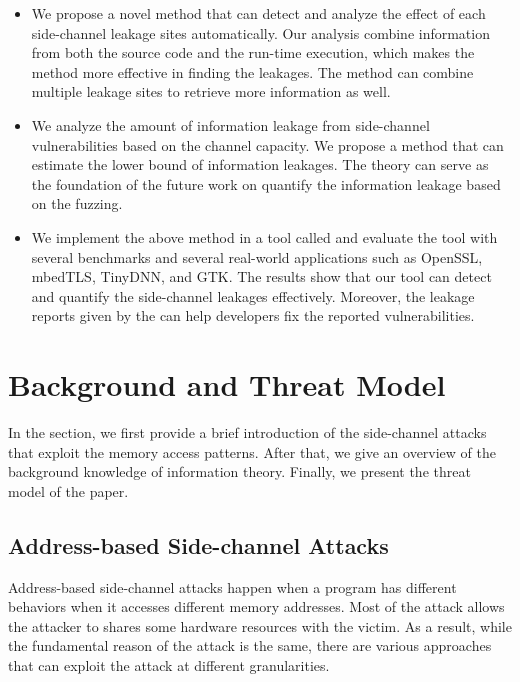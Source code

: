 \begin{itemize}

\item We propose a novel method that can detect and analyze the effect of each side-channel leakage sites automatically. Our analysis combine information from both the source code and the run-time execution, which makes the method more effective in finding the leakages. The method can combine multiple leakage sites to retrieve more information as well.

\item We analyze the amount of information leakage from side-channel vulnerabilities based on the channel capacity. We propose a method that can estimate the lower bound of information leakages. The theory can serve as the foundation of the future work on quantify the information leakage based on the fuzzing.

\item We implement the above method in a tool called \tool{} and evaluate the tool with several benchmarks and several real-world applications such as OpenSSL, mbedTLS, TinyDNN, and GTK. The results show that our tool can detect and quantify the side-channel leakages effectively. Moreover, the leakage reports given by the \tool{} can help developers fix the reported vulnerabilities.
\end{itemize}

\section{Background and Threat Model}
In the section, we first provide a brief introduction of the side-channel attacks that exploit the memory access patterns. After that, we give an overview of the background knowledge of information theory. Finally, we present the threat model of the paper.

\subsection{Address-based Side-channel Attacks}
Address-based side-channel attacks happen when a program has different behaviors when it accesses different memory addresses. Most of the attack allows the attacker to shares some hardware resources with the victim. As a result, while the fundamental reason of the attack is the same, there are various approaches that can exploit the attack at different granularities. 

